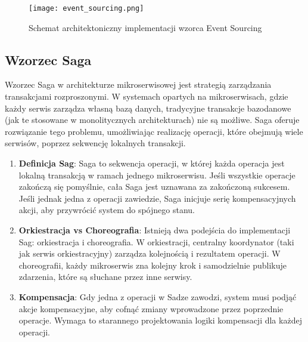 \begin{figure}[!h]
    \centering \texttt{[image: event\_sourcing.png]}
    \caption{Schemat architektoniczny implementacji wzorca Event Sourcing}
\end{figure}

\subsection{Wzorzec Saga}

Wzorzec Saga \cite{saga} w architekturze mikroserwisowej jest strategią zarządzania transakcjami rozproszonymi. W systemach opartych na mikroserwisach, gdzie każdy serwis zarządza własną bazą danych, tradycyjne transakcje bazodanowe (jak te stosowane w monolitycznych architekturach) nie są możliwe. Saga oferuje rozwiązanie tego problemu, umożliwiając realizację operacji, które obejmują wiele serwisów, poprzez sekwencję lokalnych transakcji.

\begin{enumerate}

    \item \textbf{Definicja Sag}: Saga to sekwencja operacji, w której każda operacja jest lokalną transakcją w ramach jednego mikroserwisu. Jeśli wszystkie operacje zakończą się pomyślnie, cała Saga jest uznawana za zakończoną sukcesem. Jeśli jednak jedna z operacji zawiedzie, Saga inicjuje serię kompensacyjnych akcji, aby przywrócić system do spójnego stanu.

    \item \textbf{Orkiestracja vs Choreografia}: Istnieją dwa podejścia do implementacji Sag: orkiestracja i choreografia. W orkiestracji, centralny koordynator (taki jak serwis orkiestracyjny) zarządza kolejnością i rezultatem operacji. W choreografii, każdy mikroserwis zna kolejny krok i samodzielnie publikuje zdarzenia, które są słuchane przez inne serwisy.

    \item \textbf{Kompensacja}: Gdy jedna z operacji w Sadze zawodzi, system musi podjąć akcje kompensacyjne, aby cofnąć zmiany wprowadzone przez poprzednie operacje. Wymaga to starannego projektowania logiki kompensacji dla każdej operacji.

\end{enumerate}
